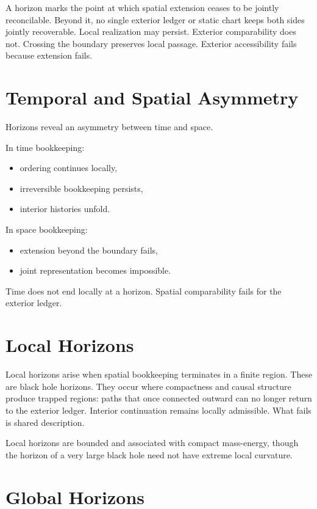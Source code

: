 \documentclass[11pt,twoside,openright]{book}
\begin{document}
A horizon marks the point at which spatial extension ceases to be jointly reconcilable. Beyond it, no single exterior ledger or static chart keeps both sides jointly recoverable. Local realization may persist. Exterior comparability does not. Crossing the boundary preserves local passage. Exterior accessibility fails because extension fails.

\section*{Temporal and Spatial Asymmetry}

Horizons reveal an asymmetry between time and space.

In time bookkeeping:

\begin{itemize}
\item ordering continues locally,
\item irreversible bookkeeping persists,
\item interior histories unfold.
\end{itemize}

In space bookkeeping:

\begin{itemize}
\item extension beyond the boundary fails,
\item joint representation becomes impossible.
\end{itemize}

Time does not end locally at a horizon. Spatial comparability fails for the exterior ledger.

\section*{Local Horizons}

Local horizons arise when spatial bookkeeping terminates in a finite region. These are black hole horizons. They occur where compactness and causal structure produce trapped regions: paths that once connected outward can no longer return to the exterior ledger. Interior continuation remains locally admissible. What fails is shared description.

Local horizons are bounded and associated with compact mass-energy, though the horizon of a very large black hole need not have extreme local curvature.

\section*{Global Horizons}
\end{document}
